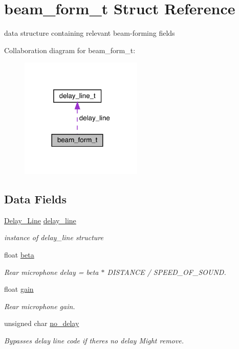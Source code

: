 \hypertarget{structbeam__form__t}{}\section{beam\+\_\+form\+\_\+t Struct Reference}
\label{structbeam__form__t}


data structure containing relevant beam-\/forming fields  




Collaboration diagram for beam\+\_\+form\+\_\+t\+:\nopagebreak
\begin{figure}[H]
\begin{center}
\leavevmode
\includegraphics[width=165pt]{structbeam__form__t__coll__graph}
\end{center}
\end{figure}
\subsection*{Data Fields}
\begin{DoxyCompactItemize}
\item 
\mbox{\hyperlink{delay__line_8h_aa62b49f8bfee0c3a174896c9b446d68d}{Delay\+\_\+\+Line}} \mbox{\hyperlink{structbeam__form__t_ac6ce5ad03bc83781b2752c67b3803871}{delay\+\_\+line}}
\begin{DoxyCompactList}\small\item\em instance of delay\+\_\+line structure \end{DoxyCompactList}\item 
float \mbox{\hyperlink{structbeam__form__t_a327d18550d19abd047f7f89711ac61fc}{beta}}
\begin{DoxyCompactList}\small\item\em Rear microphone delay = beta $\ast$ D\+I\+S\+T\+A\+N\+CE / S\+P\+E\+E\+D\+\_\+\+O\+F\+\_\+\+S\+O\+U\+ND. \end{DoxyCompactList}\item 
float \mbox{\hyperlink{structbeam__form__t_a0fa1b33edfad76e13c1593da0537070e}{gain}}
\begin{DoxyCompactList}\small\item\em Rear microphone gain. \end{DoxyCompactList}\item 
unsigned char \mbox{\hyperlink{structbeam__form__t_a6358c3b8f9b4940a50c7fe48bade9e6b}{no\+\_\+delay}}
\begin{DoxyCompactList}\small\item\em Bypasses delay line code if there\textquotesingle{}s no delay Might remove. \end{DoxyCompactList}\end{DoxyCompactItemize}


